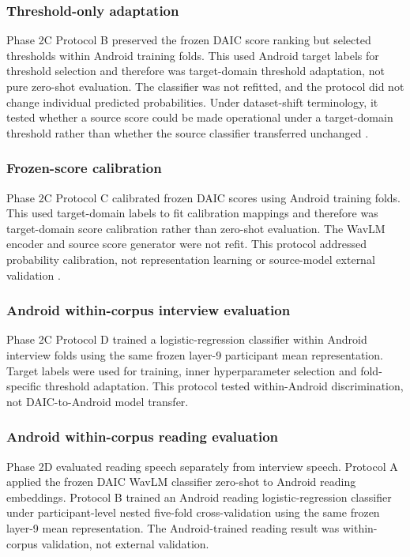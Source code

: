 \documentclass[lettersize,journal]{IEEEtran}
\begin{document}
\subsubsection{Threshold-only adaptation}

Phase 2C Protocol B preserved the frozen DAIC score ranking but selected thresholds within Android training folds. This used Android target labels for threshold selection and therefore was target-domain threshold adaptation, not pure zero-shot evaluation. The classifier was not refitted, and the protocol did not change individual predicted probabilities. Under dataset-shift terminology, it tested whether a source score could be made operational under a target-domain threshold rather than whether the source classifier transferred unchanged \cite{morenoTorres2012datasetShift}.

\subsubsection{Frozen-score calibration}

Phase 2C Protocol C calibrated frozen DAIC scores using Android training folds. This used target-domain labels to fit calibration mappings and therefore was target-domain score calibration rather than zero-shot evaluation. The WavLM encoder and source score generator were not refit. This protocol addressed probability calibration, not representation learning or source-model external validation \cite{niculescuMizil2005probabilities,vanCalster2019calibration}.

\subsubsection{Android within-corpus interview evaluation}

Phase 2C Protocol D trained a logistic-regression classifier within Android interview folds using the same frozen layer-9 participant mean representation. Target labels were used for training, inner hyperparameter selection and fold-specific threshold adaptation. This protocol tested within-Android discrimination, not DAIC-to-Android model transfer.

\subsubsection{Android within-corpus reading evaluation}

Phase 2D evaluated reading speech separately from interview speech. Protocol A applied the frozen DAIC WavLM classifier zero-shot to Android reading embeddings. Protocol B trained an Android reading logistic-regression classifier under participant-level nested five-fold cross-validation using the same frozen layer-9 mean representation. The Android-trained reading result was within-corpus validation, not external validation.
\end{document}
